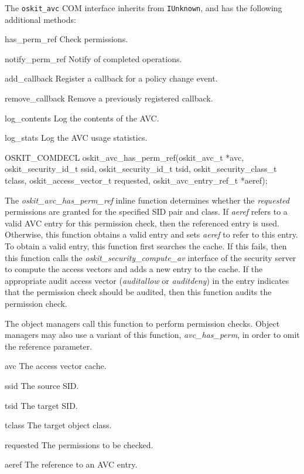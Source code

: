 The {\tt oskit_avc} COM interface inherits from {\tt IUnknown},
and has the following additional methods:	
\begin{csymlist}
\item[has\_perm\_ref]
	Check permissions.
\item[notify\_perm\_ref]
	Notify of completed operations.
\item[add\_callback]
	Register a callback for a policy change event.
\item[remove\_callback]
	Remove a previously registered callback.
\item[log\_contents]
	Log the contents of the AVC.
\item[log\_stats]
	Log the AVC usage statistics.
\end{csymlist}

\begin{apisyn}

	\funcproto OSKIT_COMDECL
	oskit_avc_has_perm_ref(oskit_avc_t *avc, 
		         oskit_security_id_t ssid,
			 oskit_security_id_t tsid,
                         oskit_security_class_t tclass,
			 oskit_access_vector_t requested,
		  	 \inoutparam oskit_avc_entry_ref_t *aeref);
\end{apisyn}
\begin{apidesc}

The \emph{oskit\_avc\_has\_perm\_ref} inline function determines
whether the \emph{requested} permissions are granted for the specified
SID pair and class.  If \emph{aeref} refers to a valid AVC entry for
this permission check, then the referenced entry is used.  Otherwise,
this function obtains a valid entry and sets \emph{aeref} to refer to
this entry.  To obtain a valid entry, this function first searches the
cache.  If this fails, then this function calls the
\emph{oskit\_security\_compute\_av} interface of the security server to
compute the access vectors and adds a new entry to the cache.  If the
appropriate audit access vector (\emph{auditallow} or
\emph{auditdeny}) in the entry indicates that the permission check
should be audited, then this function audits the permission check.
 
The object managers call this function to perform permission
checks.  Object managers may also use a variant of this
function, \emph{avc\_has\_perm}, in order to omit the reference 
parameter.

\end{apidesc}
\begin{apiparm}
	\item[avc]
		The access vector cache.
	\item[ssid]
		The source SID.
	\item[tsid]
		The target SID.
	\item[tclass]
		The target object class.
	\item[requested]
		The permissions to be checked.
	\item[aeref]
		The reference to an AVC entry.
\end{apiparm}
